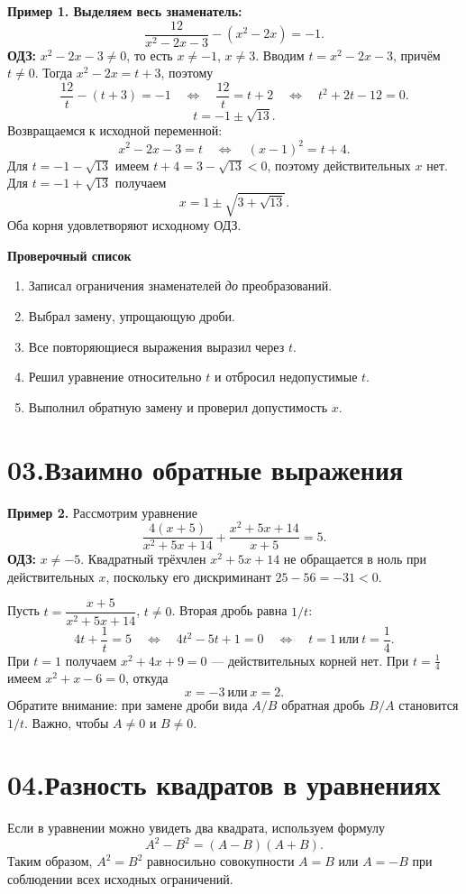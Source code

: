 \documentclass[a4paper,12pt]{article}
\newcommand{\subnote}[1]{{\color{softgray}\small #1}}
\newcommand{\strong}[1]{{\color{darkaccent}\textbf{#1}}}
\begin{document}
\textbf{Пример 1. Выделяем весь знаменатель:}
\[
\frac{12}{x^2-2x-3}-(x^2-2x)=-1.
\]
\strong{ОДЗ:} $x^2-2x-3\ne0$, то есть $x\ne-1$, $x\ne3$.
Вводим $t=x^2-2x-3$, причём $t\ne0$. Тогда $x^2-2x=t+3$, поэтому
\[
\frac{12}{t}-(t+3)=-1
\quad\Longleftrightarrow\quad
\frac{12}{t}=t+2
\quad\Longleftrightarrow\quad
t^2+2t-12=0.
\]
\[
t=-1\pm\sqrt{13}.
\]
Возвращаемся к исходной переменной:
\[
x^2-2x-3=t\quad\Longleftrightarrow\quad (x-1)^2=t+4.
\]
Для $t=-1-\sqrt{13}$ имеем $t+4=3-\sqrt{13}<0$,
поэтому действительных $x$ нет. Для $t=-1+\sqrt{13}$ получаем
\[
\boxed{x=1\pm\sqrt{3+\sqrt{13}}.}
\]
Оба корня удовлетворяют исходному ОДЗ.

\textbf{Проверочный список}
\begin{enumerate}[label=$\square$,leftmargin=10mm,itemsep=.29em]
\item Записал ограничения знаменателей \emph{до} преобразований.
\item Выбрал замену, упрощающую дроби.
\item Все повторяющиеся выражения выразил через $t$.
\item Решил уравнение относительно $t$ и отбросил недопустимые $t$.
\item Выполнил обратную замену и проверил допустимость $x$.
\end{enumerate}

\clearpage
\section*{\color{darkaccent}03.\quad Взаимно обратные выражения}
\textbf{Пример 2.} Рассмотрим уравнение
\[
\frac{4(x+5)}{x^2+5x+14}+\frac{x^2+5x+14}{x+5}=5.
\]
\strong{ОДЗ:} $x\ne-5$. Квадратный трёхчлен $x^2+5x+14$
не обращается в ноль при действительных $x$, поскольку его
дискриминант $25-56=-31<0$.

Пусть $t=\dfrac{x+5}{x^2+5x+14}$, $t\ne0$. Вторая дробь равна $1/t$:
\[
4t+\frac1t=5\quad\Longleftrightarrow\quad
4t^2-5t+1=0
\quad\Longleftrightarrow\quad t=1\ \text{или}\ t=\frac14.
\]
При $t=1$ получаем $x^2+4x+9=0$ --- действительных корней нет.
При $t=\frac14$ имеем $x^2+x-6=0$, откуда
\[
\boxed{x=-3\ \text{или}\ x=2.}
\]
\subnote{Обратите внимание: при замене дроби вида $A/B$ обратная дробь $B/A$
становится $1/t$. Важно, чтобы $A\ne0$ и $B\ne0$.}

\medskip
\section*{\color{darkaccent}04.\quad Разность квадратов в уравнениях}
Если в уравнении можно увидеть два квадрата,
используем формулу
\[
A^2-B^2=(A-B)(A+B).
\]
Таким образом, $A^2=B^2$ равносильно совокупности $A=B$ или $A=-B$
при соблюдении всех исходных ограничений.
\end{document}
